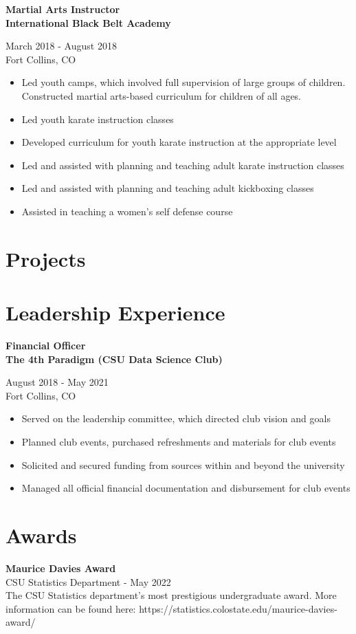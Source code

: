 \documentclass{article}
\newcommand{\resumeSubheading}[5]{
\noindent\begin{minipage}{0.5\textwidth}
	\begin{flushleft}
	\textbf{#1}\\
	\textbf{#2}\\
	\end{flushleft}
\end{minipage}%
\hfill
\begin{minipage}{0.5\textwidth}
	\begin{flushright}
	#3\\
	#4\\
	\end{flushright}
\end{minipage}%
\newline
#5
}
\newcommand{\award}[4]{
\begin{flushleft}
\textbf{#1}\\
#2 - #3\\
#4\\
\end{flushleft}
\leavevmode
}
\begin{document}
\resumeSubheading{Martial Arts Instructor}{International Black Belt Academy}{March 2018 - August 2018}{Fort Collins, CO}{
\begin{itemize}
	\item Led youth camps, which involved full supervision of large
		groups of children. Constructed martial arts-based curriculum for children of
		all ages.
	\item Led youth karate instruction classes
	\item Developed curriculum for youth karate instruction at the appropriate level
	\item Led and assisted with planning and teaching adult karate instruction classes
	\item Led and assisted with planning and teaching adult kickboxing classes
	\item Assisted in teaching a women's self defense course
\end{itemize}
}



\section{Projects}

\section{Leadership Experience}

\resumeSubheading{Financial Officer}{The 4th Paradigm (CSU Data Science Club)}{August 2018 - May 2021}{Fort Collins, CO}{
\begin{itemize}
	\item Served on the leadership committee, which directed club vision and goals
	\item Planned club events, purchased refreshments and materials for club events
	\item Solicited and secured funding from sources within and beyond the university
	\item Managed all official financial documentation and disbursement for club events
\end{itemize}
}



\section{Awards}

\award{Maurice Davies Award}{CSU Statistics Department}{May 2022}{
	The CSU Statistics department's most prestigious undergraduate award.
	More information can be found here:
	https://statistics.colostate.edu/maurice-davies-award/
}
\end{document}
